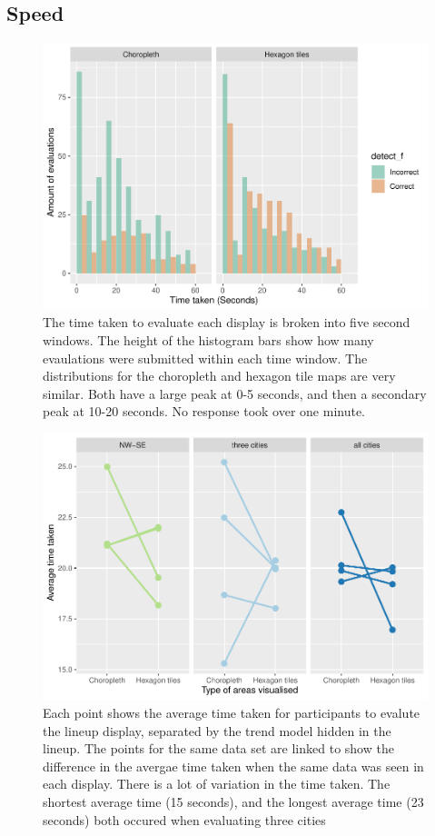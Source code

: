 \documentclass[conference,final,]{IEEEtran}
\makeatletter
\def\maxwidth{\ifdim\Gin@nat@width>\linewidth\linewidth
\else\Gin@nat@width\fi}
\let\Oldincludegraphics\includegraphics
\renewcommand{\includegraphics}[1]{\Oldincludegraphics[width=\maxwidth]{#1}}
\makeatother
\begin{document}
\hypertarget{speed}{%
\subsection{Speed}\label{speed}}

\begin{figure}
\centering
\includegraphics{paper_files/figure-latex/time-1.pdf}
\caption{The time taken to evaluate each display is broken into five
second windows. The height of the histogram bars show how many
evaulations were submitted within each time window. The distributions
for the choropleth and hexagon tile maps are very similar. Both have a
large peak at 0-5 seconds, and then a secondary peak at 10-20 seconds.
No response took over one minute.}
\end{figure}

\begin{figure}
\centering
\includegraphics{paper_files/figure-latex/time_compare-1.pdf}
\caption{Each point shows the average time taken for participants to
evalute the lineup display, separated by the trend model hidden in the
lineup. The points for the same data set are linked to show the
difference in the avergae time taken when the same data was seen in each
display. There is a lot of variation in the time taken. The shortest
average time (15 seconds), and the longest average time (23 seconds)
both occured when evaluating three cities}
\end{figure}
\end{document}
